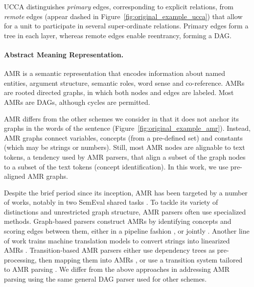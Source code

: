 \documentclass[11pt,a4paper]{article}
\begin{document}
UCCA distinguishes \textit{primary} edges, corresponding 
to explicit relations, from \textit{remote} edges (appear dashed in
Figure~\ref{fig:original_example_ucca}) that allow for a unit to participate
in several super-ordinate relations.
Primary edges form a tree in each layer, whereas remote edges enable reentrancy, forming a DAG.

\paragraph{Abstract Meaning Representation.}\label{sec:amr}

AMR \cite{banarescu2013abstract} is a semantic representation that encodes information about named entities, 
argument structure, semantic roles, word sense and co-reference.
AMRs are rooted directed graphs, in which both nodes and edges are labeled.
Most AMRs are DAGs, although cycles are permitted.

AMR differs from the other schemes we consider in that it does not anchor its graphs
in the words of the sentence (Figure~\ref{fig:original_example_amr}). Instead, AMR graphs
connect variables, concepts (from a pre-defined set) and constants (which may be strings or numbers).
Still, most AMR nodes are alignable to text tokens, a tendency used by AMR parsers,
that align a subset of the graph nodes to a subset of the text tokens (concept identification). In this work, we use pre-aligned AMR graphs.

Despite the brief period since its inception, AMR has been targeted by a number of works,
notably in two SemEval shared tasks \cite{may2016semeval,may2017semeval}.
To tackle its variety of distinctions and unrestricted graph structure,
AMR parsers often use specialized methods.
Graph-based parsers construct AMRs
by identifying concepts and scoring edges between them, either in a pipeline fashion
\cite{flanigan2014discriminative,artzi2015broad,pust2015parsing,foland2017abstract},
or jointly \cite{zhou2016amr}.
Another line of work %
trains machine translation models to convert strings into linearized AMRs
\cite{barzdins2016riga,Gildea2017AddressingTD,Konstas2017NeuralAS,Buys2017RobustIN}.
Transition-based AMR parsers either 
use dependency trees as pre-processing, then mapping them into AMRs
\cite{wang-xue-pradhan:2015:ACL-IJCNLP,wang2015transition,wang-EtAl:2016:SemEval,goodman2016noise},
or use a transition system tailored to AMR parsing \cite{damonte-17,D17-1130}.
We differ from the above approaches in addressing AMR parsing 
using the same general DAG parser used for other schemes.
\end{document}
